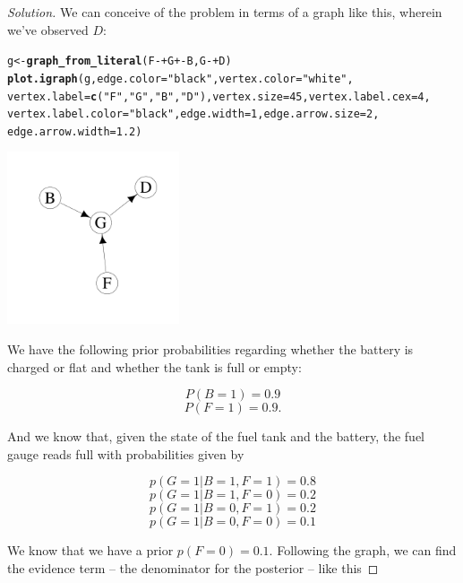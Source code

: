 \documentclass[11pt, oneside]{article}\usepackage[]{graphicx}\usepackage[]{color}
\makeatletter
\newcommand{\hlnum}[1]{\textcolor[rgb]{0.686,0.059,0.569}{#1}}%
\newcommand{\hlstr}[1]{\textcolor[rgb]{0.192,0.494,0.8}{#1}}%
\newcommand{\hlopt}[1]{\textcolor[rgb]{0,0,0}{#1}}%
\newcommand{\hlstd}[1]{\textcolor[rgb]{0.345,0.345,0.345}{#1}}%
\newcommand{\hlkwb}[1]{\textcolor[rgb]{0.69,0.353,0.396}{#1}}%
\newcommand{\hlkwc}[1]{\textcolor[rgb]{0.333,0.667,0.333}{#1}}%
\newcommand{\hlkwd}[1]{\textcolor[rgb]{0.737,0.353,0.396}{\textbf{#1}}}%
\newenvironment{kframe}{%
 \def\at@end@of@kframe{}%
 \ifinner\ifhmode%
  \def\at@end@of@kframe{\end{minipage}}%
  \begin{minipage}{\columnwidth}%
 \fi\fi%
 \def\FrameCommand##1{\hskip\@totalleftmargin \hskip-\fboxsep
 \colorbox{shadecolor}{##1}\hskip-\fboxsep
     \hskip-\linewidth \hskip-\@totalleftmargin \hskip\columnwidth}%
 \MakeFramed {\advance\hsize-\width
   \@totalleftmargin\z@ \linewidth\hsize
   \@setminipage}}%
 {\par\unskip\endMakeFramed%
 \at@end@of@kframe}
\newenvironment{knitrout}{}{} %
\newenvironment{solution}
  {\begin{proof}[Solution]}
  {\end{proof}}
\makeatother
\begin{document}
\begin{solution}
We can conceive of the problem in terms of a graph like this, wherein we've observed $D$:

\begin{knitrout}
\color{fgcolor}\begin{kframe}
\begin{alltt}
\hlstd{g} \hlkwb{<-} \hlkwd{graph_from_literal}\hlstd{(F}\hlopt{-+}\hlstd{G}\hlopt{+-}\hlstd{B, G}\hlopt{-+}\hlstd{D)}
\hlkwd{plot.igraph}\hlstd{(g,} \hlkwc{edge.color} \hlstd{=} \hlstr{"black"}\hlstd{,} \hlkwc{vertex.color} \hlstd{=} \hlstr{"white"}\hlstd{,}
            \hlkwc{vertex.label} \hlstd{=} \hlkwd{c}\hlstd{(}\hlstr{"F"}\hlstd{,}\hlstr{"G"}\hlstd{,}\hlstr{"B"}\hlstd{,} \hlstr{"D"}\hlstd{),} \hlkwc{vertex.size} \hlstd{=} \hlnum{45}\hlstd{,} \hlkwc{vertex.label.cex} \hlstd{=} \hlnum{4}\hlstd{,}
            \hlkwc{vertex.label.color} \hlstd{=} \hlstr{"black"}\hlstd{,} \hlkwc{edge.width} \hlstd{=} \hlnum{1}\hlstd{,} \hlkwc{edge.arrow.size} \hlstd{=} \hlnum{2}\hlstd{,}
            \hlkwc{edge.arrow.width} \hlstd{=} \hlnum{1.2}\hlstd{)}
\end{alltt}
\end{kframe}
\includegraphics[width=2in]{figure/unnamed-chunk-2-1} 

\end{knitrout}

We have the following prior probabilities regarding whether the battery is charged or flat and whether the tank is full or empty:

$$P(B=1) = 0.9$$
$$P(F=1) = 0.9.$$

And we know that, given the state of the fuel tank and the battery, the fuel gauge reads full with probabilities given by

$$p(G = 1|B = 1, F = 1) = 0.8$$
$$p(G = 1|B = 1, F = 0) = 0.2$$
$$p(G = 1|B = 0, F = 1) = 0.2$$
$$p(G = 1|B = 0, F = 0) = 0.1$$

We know that we have a prior $p(F=0) = 0.1$. Following the graph, we can find the evidence term -- the denominator for the posterior -- like this


\end{solution}
\end{document}
